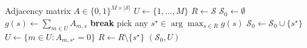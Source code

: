 \begin{algorithm}[!htbp]
\caption{Greedy subcover}
\label{alg:greedy_subcover}
\begin{algorithmic}[1]
\Require Adjacency matrix $A\in\{0,1\}^{M\times|\mathcal{S}|}$
\State $U \gets \{1,\dots,M\}$ 
\State $R \gets \mathcal{S}$ 
\State $\mathcal{S}_0 \gets \emptyset$
        \State $g(s) \gets \sum_{m\in U} A_{m,s}$ 
    \EndFor
        \State \textbf{break}
    \EndIf
    \State pick any $s^\star \in\arg\max_{s\in R} g(s)$
    \State $\mathcal{S}_0 \gets \mathcal{S}_0 \cup \{s^\star\}$
    \State $U \gets \{m\in U: A_{m,s^\star}=0\}$ 
    \State $R \gets R\setminus\{s^\star\}$
\EndWhile
\State \Return $(\mathcal{S}_0,U)$ 
\end{algorithmic}
\end{algorithm}
